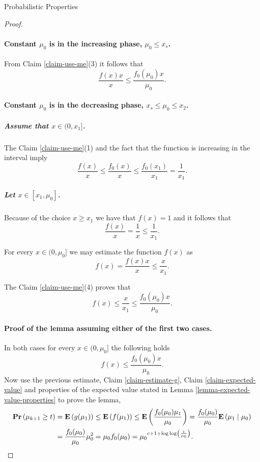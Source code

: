 \begin{section}{Probabilistic Properties}
\begin{proof}
\paragraph{Constant $\mu_0$ is in the increasing phase, $\mu_0 \leq x_s$.}
From Claim \ref{claim-use-me}(3) it follows that \[ \frac{f(x)x}{x} \leq \frac{f_0(\mu_0)x}{\mu_0} \text{.} \]

\paragraph{Constant $\mu_0$ is in the decreasing phase, $x_s \leq \mu_0 \leq x_2$.}
\subparagraph{Assume that $x \in (0, x_1]$.} The Claim \ref{claim-use-me}(1) and the fact that the function is increasing in the interval imply
\[
	\frac{f(x)}{x} \leq \frac{f_0(x)}{x} \leq \frac{f_0(x_1)}{x_1} = \frac{1}{x_1} \text{.}
\]

\subparagraph{Let $x \in [x_1, \mu_0]$.} Because of the choice $x \geq x_1$ we have that $f(x) = 1$ and it follows that 
\[ 
	\frac{f(x)}{x} = \frac{1}{x} \leq \frac{1}{x_1} \text{.}
\]

For every $x \in (0, \mu_0]$ we may estimate the function $f(x)$ as \[f(x) = \frac{f(x)x}{x} \leq \frac{x}{x_1} \text{.} \]

The Claim \ref{claim-use-me}(4) proves that
\[
	f(x) \leq \frac{x}{x_1} \leq \frac{f_0(\mu_0)x}{\mu_0} \text{.}
\]

\paragraph{Proof of the lemma assuming either of the first two cases.}
In both cases for every $x \in (0, \mu_0]$ the following holds \[ f(x) \leq \frac{f_0(\mu_0)x}{\mu_0} \text{.} \] Now use the previous estimate, Claim \ref{claim-estimate-g}, Claim \ref{claim-expected-value} and properties of the expected value stated in Lemma \ref{lemma-expected-value-properties} to prove the lemma,
\[
\begin{split}
\mathbf{Pr}\left(\mu_{k + 1} \geq t\right)
	& = \mathbf{E}\left(g(\mu_1)\right) \leq \mathbf{E}\left(f(\mu_1)\right) \leq \mathbf{E}\left(\frac{f_0(\mu_0)\mu_1}{\mu_0}\right) = \frac{f_0(\mu_0)}{\mu_0}\mathbf{E}\left(\mu_1 \mid \mu_0\right) \\
	& = \frac{f_0(\mu_0)}{\mu_0}\mu_0 ^ 2 = \mu_0 f_0(\mu_0) = {\mu_0}^{c + 1 + \log \log \left(\frac{1}{\mu_0}\right)} \text{.}
\end{split}
\]


\end{proof}
\end{section}
